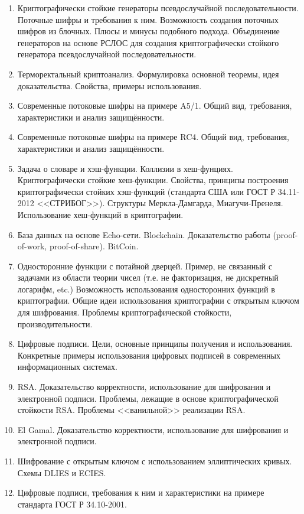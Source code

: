 \begin{enumerate}
    \item Криптографически стойкие генераторы псевдослучайной последовательности. Поточные шифры и требования к ним. Возможность создания поточных шифров из блочных. Плюсы и минусы подобного подхода. Объединение генераторов на основе РСЛОС для создания криптографически стойкого генератора псевдослучайной последовательности.
    \item Терморектальный криптоанализ. Формулировка основной теоремы, идея доказательства. Свойства, примеры использования.
    \item Современные потоковые шифры на примере A5/1. Общий вид, требования, характеристики и анализ защищённости.
    \item Современные потоковые шифры на примере RC4. Общий вид, требования, характеристики и анализ защищённости.
    \item Задача о словаре и хэш-функции. Коллизии в хеш-фунциях. Криптографически стойкие хеш-функции. Свойства, принципы построения криптографически стойких хэш-функций (стандарта США или ГОСТ Р 34.11-2012 <<СТРИБОГ>>). Структуры Меркла-Дамгарда, Миагучи-Пренеля. Использование хеш-функций в криптографии.
    \item База данных на основе Echo-сети. Blockchain. Доказательство работы (proof-of-work, proof-of-share). BitCoin.
    \item Односторонние функции с потайной дверцей. Пример, не связанный с задачами из области теории чисел (т.е. не факторизация, не дискретный логарифм, etc.) Возможность использования односторонних функций в криптографии. Общие идеи использования криптографии с открытым ключом для шифрования. Проблемы криптографической стойкости, производительности.
    \item Цифровые подписи. Цели, основные принципы получения и использования. Конкретные примеры использования цифровых подписей в современных информационных системах.
    \item RSA. Доказательство корректности, использование для шифрования и электронной подписи. Проблемы, лежащие в основе криптографической стойкости RSA. Проблемы <<ванильной>> реализации RSA.
    \item El Gamal. Доказательство корректности, использование для шифрования и электронной подписи.
    \item Шифрование с открытым ключом с использованием эллиптических кривых. Схемы DLIES и ECIES.
    \item Цифровые подписи, требования к ним и характеристики на примере стандарта ГОСТ Р 34.10-2001.

\end{enumerate}
